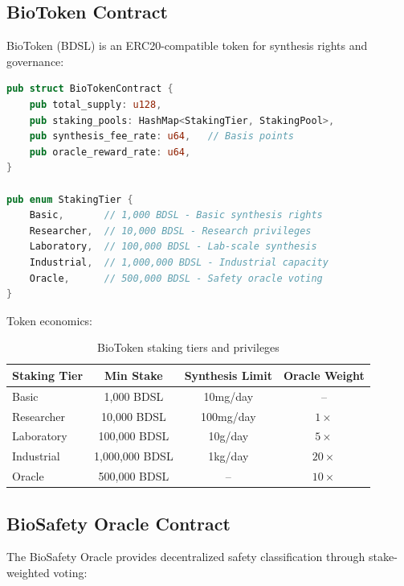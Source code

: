 \documentclass[12pt,a4paper]{article}
\begin{document}
\subsection{BioToken Contract}

BioToken (BDSL) is an ERC20-compatible token for synthesis rights and governance:

\begin{lstlisting}[language=Rust,caption={BioToken staking tiers}]
pub struct BioTokenContract {
    pub total_supply: u128,
    pub staking_pools: HashMap<StakingTier, StakingPool>,
    pub synthesis_fee_rate: u64,   // Basis points
    pub oracle_reward_rate: u64,
}

pub enum StakingTier {
    Basic,       // 1,000 BDSL - Basic synthesis rights
    Researcher,  // 10,000 BDSL - Research privileges
    Laboratory,  // 100,000 BDSL - Lab-scale synthesis
    Industrial,  // 1,000,000 BDSL - Industrial capacity
    Oracle,      // 500,000 BDSL - Safety oracle voting
}
\end{lstlisting}

Token economics:

\begin{table}[H]
\centering
\begin{tabular}{lccc}
\toprule
\textbf{Staking Tier} & \textbf{Min Stake} & \textbf{Synthesis Limit} & \textbf{Oracle Weight} \\
\midrule
Basic & 1,000 BDSL & 10mg/day & -- \\
Researcher & 10,000 BDSL & 100mg/day & $1\times$ \\
Laboratory & 100,000 BDSL & 10g/day & $5\times$ \\
Industrial & 1,000,000 BDSL & 1kg/day & $20\times$ \\
Oracle & 500,000 BDSL & -- & $10\times$ \\
\bottomrule
\end{tabular}
\caption{BioToken staking tiers and privileges}
\end{table}

\subsection{BioSafety Oracle Contract}

The BioSafety Oracle provides decentralized safety classification through stake-weighted voting:
\end{document}

